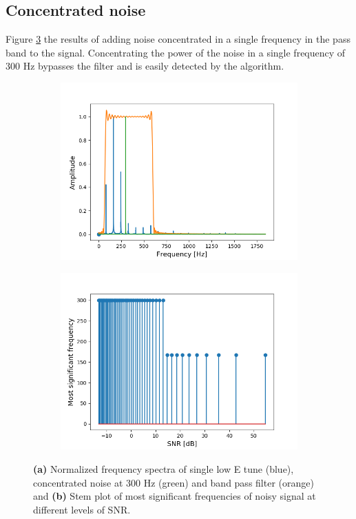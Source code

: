 \subsection{Concentrated noise}
Figure \ref{fig:concentrated_noise} the results of adding noise concentrated in a single frequency in the pass band to the signal. Concentrating the power of the noise in a single frequency of 300 Hz bypasses the filter and is easily detected by the algorithm.
\begin{figure}[H]
\begin{subfigure}{0.49\textwidth}
\centering
\includegraphics[width=\textwidth]{figures/SNR/concentrated_spectrum.png}
\caption{}
\label{fig:concentrated_spectrum}
\end{subfigure}
\begin{subfigure}{0.49\textwidth}
\centering
\includegraphics[width=\textwidth]{figures/SNR/concentrated_stem.png}
\caption{}
\label{fig:concentrated_stem}
\end{subfigure}
\caption{\textbf{(a)} Normalized frequency spectra of single low E tune (blue), concentrated noise at 300 Hz (green) and band pass filter (orange) and \textbf{(b)} Stem plot of most significant frequencies of noisy signal at different levels of SNR.}
\label{fig:concentrated_noise}
\end{figure}
